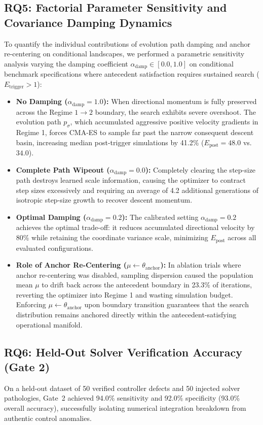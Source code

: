 \documentclass[journal]{IEEEtran}
\begin{document}
\subsection{RQ5: Factorial Parameter Sensitivity and Covariance Damping Dynamics}
\label{sec:rq5_damping_sensitivity}
To quantify the individual contributions of evolution path damping and anchor re-centering on conditional landscapes, we performed a parametric sensitivity analysis varying the damping coefficient $\alpha_{\mathrm{damp}} \in [0.0, 1.0]$ on conditional benchmark specifications where antecedent satisfaction requires sustained search ($E_{\mathrm{trigger}} > 1$):
\begin{itemize}
    \item \textbf{No Damping ($\alpha_{\mathrm{damp}} = 1.0$):} When directional momentum is fully preserved across the Regime $1 \to 2$ boundary, the search exhibits severe overshoot. The evolution path $p_\sigma$, which accumulated aggressive positive velocity gradients in Regime 1, forces CMA-ES to sample far past the narrow consequent descent basin, increasing median post-trigger simulations by 41.2\% ($E_{\mathrm{post}} = 48.0$ vs. $34.0$).
    \item \textbf{Complete Path Wipeout ($\alpha_{\mathrm{damp}} = 0.0$):} Completely clearing the step-size path destroys learned scale information, causing the optimizer to contract step sizes excessively and requiring an average of 4.2 additional generations of isotropic step-size growth to recover descent momentum.
    \item \textbf{Optimal Damping ($\alpha_{\mathrm{damp}} = 0.2$):} The calibrated setting $\alpha_{\mathrm{damp}} = 0.2$ achieves the optimal trade-off: it reduces accumulated directional velocity by 80\% while retaining the coordinate variance scale, minimizing $E_{\mathrm{post}}$ across all evaluated configurations.
    \item \textbf{Role of Anchor Re-Centering ($\mu \leftarrow \theta_{\mathrm{anchor}}$):} In ablation trials where anchor re-centering was disabled, sampling dispersion caused the population mean $\mu$ to drift back across the antecedent boundary in 23.3\% of iterations, reverting the optimizer into Regime 1 and wasting simulation budget. Enforcing $\mu \leftarrow \theta_{\mathrm{anchor}}$ upon boundary transition guarantees that the search distribution remains anchored directly within the antecedent-satisfying operational manifold.
\end{itemize}

\subsection{RQ6: Held-Out Solver Verification Accuracy (Gate 2)}
On a held-out dataset of 50 verified controller defects and 50 injected solver pathologies, Gate~2 achieved 94.0\% sensitivity and 92.0\% specificity (93.0\% overall accuracy), successfully isolating numerical integration breakdown from authentic control anomalies.
\end{document}
